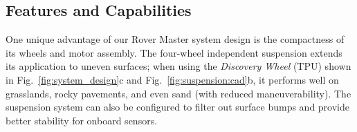 

\subsection{Features and Capabilities}
One unique advantage of our Rover Master system design is the compactness of its wheels and motor assembly. The four-wheel independent suspension extends its application to uneven surfaces; when using the \textit{Discovery Wheel} (TPU) shown in Fig.~\ref{fig:system_design}c and Fig.~\ref{fig:suspension:cad}b, it performs well on grasslands, rocky pavements, and even sand (with reduced maneuverability). The suspension system can also be configured to filter out surface bumps and provide better stability for onboard sensors.

